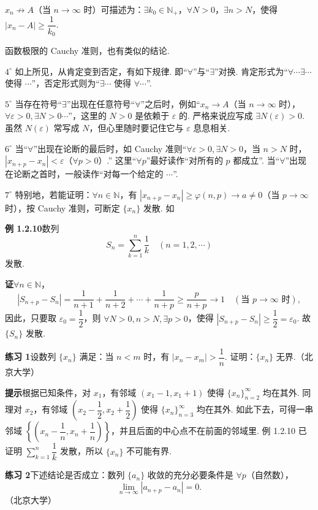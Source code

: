 \documentclass[UTF8,12pt,a4paper,fontset=fandol]{ctexart}
\begin{document}
$x_n\not\to A$（当 $n\to\infty$ 时）可描述为：$\exists k_0\in\mathbb{N}_+$，$\forall N>0$，$\exists n>N$，使得 $|x_n-A|\ge\dfrac1{k_0}$.

函数极限的 Cauchy 准则，也有类似的结论.

$4^\circ$ 如上所见，从肯定变到否定，有如下规律. 即“$\forall$”与“$\exists$”对换. 肯定形式为“$\forall\cdots\exists\cdots$ 使得 $\cdots$”，否定形式则为“$\exists\cdots$ 使得 $\forall\cdots$”.

$5^\circ$ 当存在符号“$\exists$”出现在任意符号“$\forall$”之后时，例如“$x_n\to A$（当 $n\to\infty$ 时），$\forall\varepsilon>0,\exists N>0\cdots$”，这里的 $N>0$ 是依赖于 $\varepsilon$ 的. 严格来说应写成 $\exists N(\varepsilon)>0$. 虽然 $N(\varepsilon)$ 常写成 $N$，但心里随时要记住它与 $\varepsilon$ 息息相关.

$6^\circ$ 当“$\forall$”出现在论断的最后时，如 Cauchy 准则“$\forall\varepsilon>0,\exists N>0$，当 $n>N$ 时，$|x_{n+p}-x_n|<\varepsilon$（$\forall p>0$）.” 这里“$\forall p$”最好读作“对所有的 $p$ 都成立”. 当“$\forall$”出现在论断之首时，一般读作“对每一个给定的 $\cdots$”.

$7^\circ$ 特别地，若能证明：$\forall n\in\mathbb{N}$，有 $|x_{n+p}-x_n|\ge\varphi(n,p)\to a\ne0$（当 $p\to\infty$ 时），按 Cauchy 准则，可断定 $\{x_n\}$ 发散. 如

\noindent\textbf{例 1.2.10}\quad 数列
\[
  S_n=\sum_{k=1}^n\frac1k\quad(n=1,2,\cdots)
\]
发散.

\noindent\textbf{证}\quad $\forall n\in\mathbb{N}$，
\[
  |S_{n+p}-S_n|=\frac1{n+1}+\frac1{n+2}+\cdots+\frac1{n+p}
  \ge \frac{p}{n+p}\to1\quad(\text{当 }p\to\infty\text{ 时}),
\]
因此，只要取 $\varepsilon_0=\dfrac12$，则 $\forall N>0,n>N,\exists p>0$，使得 $|S_{n+p}-S_n|\ge\dfrac12=\varepsilon_0$. 故 $\{S_n\}$ 发散.

\noindent\textbf{练习 1}\quad 设数列 $\{x_n\}$ 满足：当 $n<m$ 时，有 $|x_n-x_m|>\dfrac1n$. 证明：$\{x_n\}$ 无界.（北京大学）

\noindent\textbf{提示}\quad 根据已知条件，对 $x_1$，有邻域 $(x_1-1,x_1+1)$ 使得 $\{x_n\}_{n=2}^\infty$ 均在其外. 同理对 $x_2$，有邻域 $\left(x_2-\dfrac12,x_2+\dfrac12\right)$ 使得 $\{x_n\}_{n=3}^\infty$ 均在其外. 如此下去，可得一串邻域 $\left\{\left(x_n-\dfrac1n,x_n+\dfrac1n\right)\right\}$，并且后面的中心点不在前面的邻域里. 例 1.2.10 已证明 $\sum\limits_{k=1}^n\dfrac1k$ 发散，所以 $\{x_n\}$ 不可能有界.

\noindent\textbf{练习 2}\quad 下述结论是否成立：数列 $\{a_n\}$ 收敛的充分必要条件是 $\forall p$（自然数），
\[
  \lim_{n\to\infty}|a_{n+p}-a_n|=0.
\tag{1}
\]
（北京大学）
\end{document}
